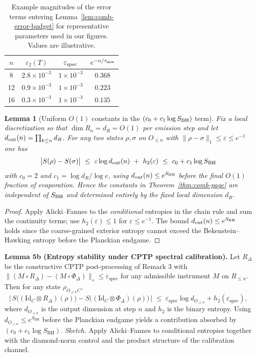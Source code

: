 \documentclass[11pt,a4paper]{article}
\theoremstyle{plain}
\newtheorem{lemma}[theorem]{Lemma}
\theoremstyle{definition}
\theoremstyle{remark}
\begin{document}
\begin{table}[t]
\centering
\caption{Example magnitudes of the error terms entering Lemma~\ref{lem:comb-error-budget} for representative parameters used in our figures.
Values are illustrative.}
\begin{tabular}{c|ccc}
\hline
$n$ & $\varepsilon_2(T)$ & $\varepsilon_{\rm spec}$ & $e^{-n/\tau_{\rm mix}}$ \\
\hline
8  & $2.8\times 10^{-3}$ & $1\times 10^{-3}$ & $0.368$ \\
12 & $0.9\times 10^{-3}$ & $1\times 10^{-3}$ & $0.223$ \\
16 & $0.3\times 10^{-3}$ & $1\times 10^{-3}$ & $0.135$ \\
\hline
\end{tabular}
\end{table}

\begin{lemma}[Uniform $O(1)$ constants in the $(c_0+c_1\log S_{\rm BH})$ term]\label{lem:log-constants}
Fix a local discretization so that $\dim R_n=d_R=O(1)$ per emission step and let $d_{\rm out}(n)=\prod_{k\le n} d_R$.
For any two states $\rho,\sigma$ on $O_{\le n}$ with $\|\rho-\sigma\|_1\le \varepsilon\le e^{-1}$ one has
\[
\big|S(\rho)-S(\sigma)\big|\ \le\ \varepsilon \log d_{\rm out}(n)\ +\ h_2(\varepsilon)\ \le\ c_0 + c_1 \log S_{\rm BH}
\]
with $c_0=2$ and $c_1=\log d_R/\log e$, using $d_{\rm out}(n)\le e^{S_{\rm BH}}$ before the final $O(1)$ fraction of evaporation.
Hence the constants in Theorem~\ref{thm:comb-page} are independent of $S_{\rm BH}$ and determined entirely by the fixed local dimension $d_R$.
\end{lemma}
\begin{proof}
Apply Alicki--Fannes to the \emph{conditional} entropies in the chain rule and sum the continuity terms; use $h_2(\varepsilon)\le 1$ for $\varepsilon\le e^{-1}$.
The bound $d_{\rm out}(n)\le e^{S_{\rm BH}}$ holds since the coarse-grained exterior entropy cannot exceed the Bekenstein--Hawking entropy before the Planckian endgame.
\end{proof}

\medskip\noindent\textbf{Lemma 5b (Entropy stability under CPTP spectral calibration).}
Let \(R_\Delta\) be the constructive CPTP post-processing of Remark 3 with \(\|(M\!\circ\!R_\Delta)-(M\!\circ\!\Phi_\Delta)\|_\diamond \le \varepsilon_{\mathrm{spec}}\) for any admissible instrument \(M\) on \(R_{\le n}\). Then for any state \(\rho_{O_{\le n}C}\),
\[
  \bigl|\,S\bigl((\mathrm{Id}_C\!\otimes\!R_\Delta)(\rho)\bigr) - S\bigl((\mathrm{Id}_C\!\otimes\!\Phi_\Delta)(\rho)\bigr)\,\bigr|
  \;\le\; \varepsilon_{\mathrm{spec}}\log d_{O_{\le n}} + h_2(\varepsilon_{\mathrm{spec}}),
\]
where \(d_{O_{\le n}}\) is the output dimension at step \(n\) and \(h_2\) is the binary entropy. Using \(d_{O_{\le n}}\le e^{S_{\mathrm{BH}}}\) before the Planckian endgame yields a contribution absorbed by \((c_0 + c_1\log S_{\mathrm{BH}})\).
\emph{Sketch.} Apply Alicki--Fannes to conditional entropies together with the diamond-norm control and the product structure of the calibration channel.
\end{document}
